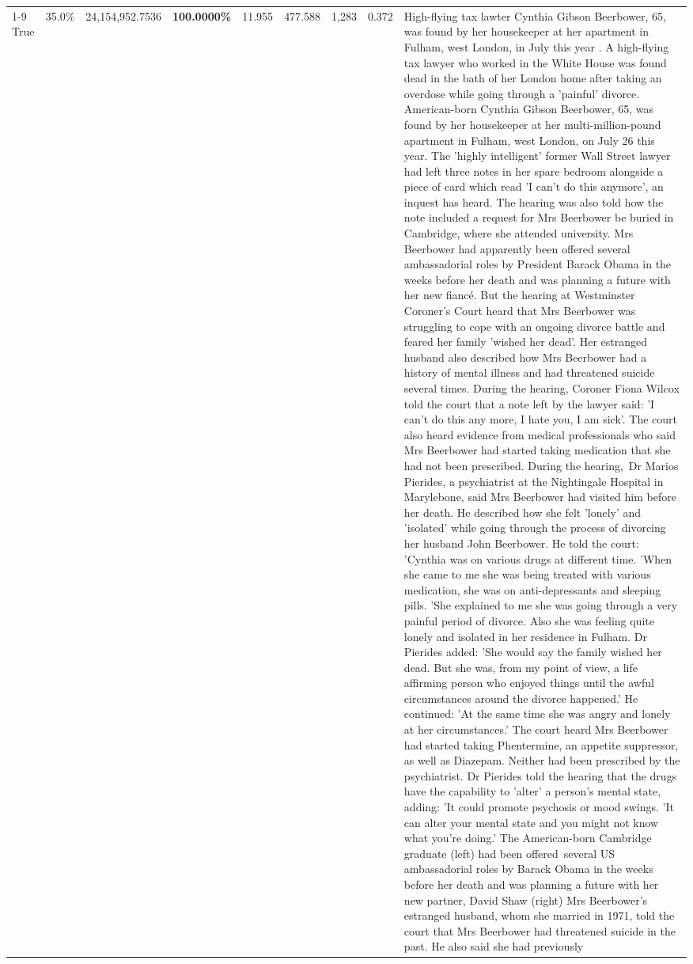 \begin{table}[H]
\begin{tabular}{lllrlllll}
\cline{1-9}
True & 35.0\% & 24,154,952.7536 & \bfseries \color{red} 100.0000\% & 11.955 & 477.588 & 1,283 & 0.372 & High-flying tax lawter Cynthia Gibson Beerbower, 65, was found by her housekeeper at her apartment in Fulham, west London, in July this year . A high-flying tax lawyer who worked in the White House was found dead in the bath of her London home after taking an overdose while going through a 'painful' divorce. American-born Cynthia Gibson Beerbower, 65, was found by her housekeeper at her multi-million-pound apartment in Fulham, west London, on July 26 this year. The 'highly intelligent' former Wall Street lawyer had left three notes in her spare bedroom alongside a piece of card which read 'I can't do this anymore', an inquest has heard. The hearing was also told how the note included a request for Mrs Beerbower be buried in Cambridge, where she attended university. Mrs Beerbower had apparently been offered several ambassadorial roles by President Barack Obama in the weeks before her death and was planning a future with her new fiancé. But the hearing at Westminster Coroner's Court heard that Mrs Beerbower was struggling to cope with an ongoing divorce battle and feared her family 'wished her dead'. Her estranged husband also described how Mrs Beerbower had a history of mental illness and had threatened suicide several times. During the hearing, Coroner Fiona Wilcox told the court that a note left by the lawyer said: 'I can't do this any more, I hate you, I am sick'. The court also heard evidence from medical professionals who said Mrs Beerbower had started taking medication that she had not been prescribed. During the hearing, Dr Marios Pierides, a psychiatrist at the Nightingale Hospital in Marylebone, said Mrs Beerbower had visited him before her death. He described how she felt 'lonely' and 'isolated' while going through the process of divorcing her husband John Beerbower. He told the court: 'Cynthia was on various drugs at different time. 'When she came to me she was being treated with various medication, she was on anti-depressants and sleeping pills. 'She explained to me she was going through a very painful period of divorce. Also she was feeling quite lonely and isolated in her residence in Fulham. Dr Pierides added: 'She would say the family wished her dead. But she was, from my point of view, a life affirming person who enjoyed things until the awful circumstances around the divorce happened.' He continued: 'At the same time she was angry and lonely at her circumstances.' The court heard Mrs Beerbower had started taking Phentermine, an appetite suppressor, as well as Diazepam. Neither had been prescribed by the psychiatrist. Dr Pierides told the hearing that the drugs have the capability to 'alter' a person's mental state, adding: 'It could promote psychosis or mood swings. 'It can alter your mental state and you might not know what you're doing.' The American-born Cambridge graduate (left) had been offered several US ambassadorial roles by Barack Obama in the weeks before her death and was planning a future with her new partner, David Shaw (right) Mrs Beerbower's estranged husband, whom she married in 1971, told the court that Mrs Beerbower had threatened suicide in the past. He also said she had previously 
\end{tabular}
\end{table}
